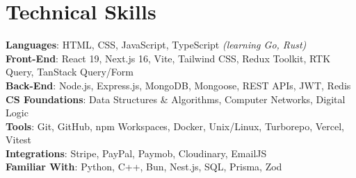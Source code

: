 \documentclass[letterpaper,11pt]{article}
\begin{document}
\section{Technical Skills}
  \begin{itemize}[leftmargin=0.15in, label={}]
    \small{\item{
      \textbf{Languages}{: HTML, CSS, JavaScript, TypeScript \emph{(learning Go, Rust)}} \\
      \textbf{Front-End}{: React 19, Next.js 16, Vite, Tailwind CSS, Redux Toolkit, RTK Query, TanStack Query/Form} \\
      \textbf{Back-End}{: Node.js, Express.js, MongoDB, Mongoose, REST APIs, JWT, Redis} \\
      \textbf{CS Foundations}{: Data Structures \& Algorithms, Computer Networks, Digital Logic} \\
      \textbf{Tools}{: Git, GitHub, npm Workspaces, Docker, Unix/Linux, Turborepo, Vercel, Vitest} \\
      \textbf{Integrations}{: Stripe, PayPal, Paymob, Cloudinary, EmailJS} \\
      \textbf{Familiar With}{: Python, C++, Bun, Nest.js, SQL, Prisma, Zod}
    }}
  \end{itemize}

\end{document}
